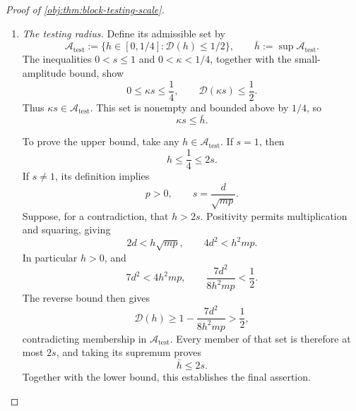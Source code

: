 \documentclass[11pt]{article}
\begin{document}
\begin{proof}[Proof of \cref{obj:thm:block-testing-scale}]
\begin{enumerate}
\item \textit{The testing radius.}
Define its admissible set by
\[
\mathcal A_{\mathrm{test}}
:=
\{h\in[0,1/4]:\mathcal D(h)\le1/2\},
\qquad
\bar h:=\sup\mathcal A_{\mathrm{test}}.
\]
The inequalities \(0<s\le1\) and \(0<\kappa<1/4\), together with the small-amplitude bound, show
\[
0\le\kappa s\le\frac14,
\qquad
\mathcal D(\kappa s)\le\frac12.
\]
Thus \(\kappa s\in\mathcal A_{\mathrm{test}}\). This set is nonempty and bounded above by \(1/4\), so
\[
\kappa s\le\bar h.
\]

To prove the upper bound, take any \(h\in\mathcal A_{\mathrm{test}}\). If \(s=1\), then
\[
h\le\frac14\le2s.
\]
If \(s\ne1\), its definition implies
\[
p>0,\qquad s=\frac d{\sqrt{mp}}.
\]
Suppose, for a contradiction, that \(h>2s\). Positivity permits multiplication and squaring, giving
\[
2d<h\sqrt{mp},
\qquad
4d^2<h^2mp.
\]
In particular \(h>0\), and
\[
7d^2<4h^2mp,
\qquad
\frac{7d^2}{8h^2mp}<\frac12.
\]
The reverse bound then gives
\[
\mathcal D(h)
\ge1-\frac{7d^2}{8h^2mp}
>\frac12,
\]
contradicting membership in \(\mathcal A_{\mathrm{test}}\). Every member of that set is therefore at most \(2s\), and taking its supremum proves
\[
\bar h\le2s.
\]
Together with the lower bound, this establishes the final assertion.
\end{enumerate}
\end{proof}
\end{document}
